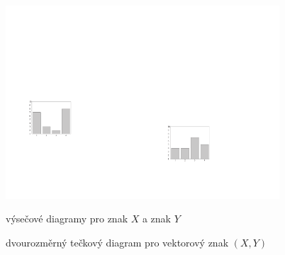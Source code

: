 \documentclass[compress,mathserif]{beamer}
\begin{document}
{\begin{overprint}
\begin{center}
\includegraphics[width=5.1cm]{obr2-5new.pdf}\quad\includegraphics[width=5.1cm]{obr2-6new.pdf} 
\end{center}
\begin{center}výsečové diagramy pro znak $X$ a znak $Y$\\[1cm]
 \end{center}
\begin{center} dvourozměrný tečkový diagram pro vektorový znak $(X, Y)$\\[0.5cm]
\end{center}


\end{overprint}}
\end{document}
